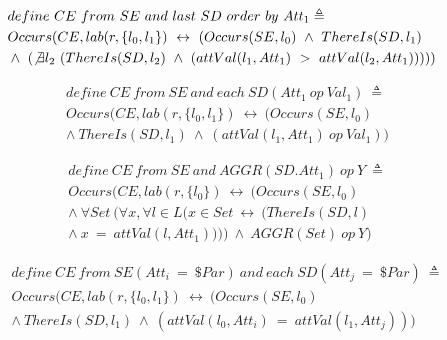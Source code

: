 \begin{align*}%
&define\ CE\ from\ SE\ and\ last\ SD\ order\ by\ Att_1\triangleq\\
&Occurs(CE, lab(r, \{l_0, l_1\})\ \leftrightarrow\ (Occurs(SE, l_0)\ \wedge\ ThereIs(SD, l_1)\\
&\wedge\ (\not \exists l_2\ (ThereIs(SD, l_2)\ \wedge\ (attVal(l_1, Att_1)\ >\ attVal(l_2, Att_1)))))
\end{align*}

\begin{align*}%
&define\ CE\ from\ SE\ and\ each\ SD(Att_1\ op \ Val_1)\ \triangleq\\
&Occurs(CE, lab(r, \{l_0, l_1\})\ \leftrightarrow\ (Occurs(SE, l_0)\\
&\wedge\ ThereIs(SD, l_1)\ \wedge\ (attVal(l_1, Att_1)\ op\ Val_1))
\end{align*}

\begin{align*}%
&define\ CE\ from\ SE\ and\ AGGR(SD.Att_1)\ op\ Y\ \triangleq\\
&Occurs(CE, lab(r, \{l_0\})\ \leftrightarrow\ (Occurs(SE, l_0)\\
&\wedge\ \forall Set\ (\forall x, \forall l \in L
(x \in Set\ \leftrightarrow\ (ThereIs(SD, l)\\
&\wedge\ x\ =\ attVal(l, Att_1))))\ \wedge\ AGGR(Set)\ op\ Y)
\end{align*}

\begin{align*}%
&define\ CE\ from\ SE(Att_i\ = \ \$Par)\ and\ each\ SD(Att_j\ = \ \$Par)\ \triangleq\\
&Occurs(CE, lab(r, \{l_0, l_1\})\ \leftrightarrow\ (Occurs(SE, l_0)\\
&\wedge\ ThereIs(SD, l_1)\ \wedge\ (attVal(l_0, Att_i)\ =\ attVal(l_1, Att_j)))
\end{align*}

